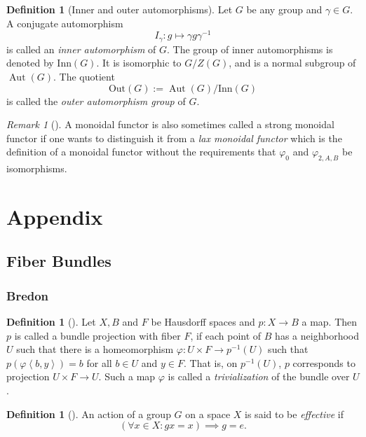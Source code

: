 \documentclass[reqno]{amsart}
\theoremstyle{definition}
\newtheorem{definition}[theorem]{Definition}
\theoremstyle{remark}
\newtheorem*{remark}{Remark}
\DeclareMathOperator{\Aut}{Aut}
\begin{document}
\begin{definition}[Inner and outer automorphisms]
    Let $G$ be any group and $\gamma \in G$. A conjugate
    automorphism 
    \[
    I_{\gamma} \colon g \mapsto \gamma g \gamma^{-1}
    \] 
    is called an \textit{inner automorphism} of $G$.
    The group of inner automorphisms is denoted
    by $\text{Inn}(G)$. It is isomorphic to
    $G / Z(G)$, and is a normal subgroup of
    $\Aut(G)$. The quotient
    \[
    \text{Out}(G) := \Aut(G) / \text{Inn}(G)
    \] 
    is called the \textit{outer automorphism group} of
    $G$.
\end{definition}



\begin{remark}[]
    A monoidal functor is also sometimes called a strong
    monoidal functor if one wants to distinguish it
    from a \textit{lax monoidal functor} which is
    the definition of a monoidal functor
    without the requirements that 
    $\varphi_0$ and $\varphi_{2,A,B}$ be isomorphisms.
\end{remark}

\section{Appendix}

\subsection{Fiber Bundles}

\subsubsection{Bredon}

\begin{definition}[]
    Let $X, B$ and $F$ be Hausdorff spaces and
    $p \colon X \to B$ a map.
    Then $p$ is called a bundle projection with
    fiber $F$, if each point of
    $B$ has a neighborhood $U$ such that there
    is a homeomorphism $\varphi \colon U \times F \to 
    p^{-1}(U) $ such that $p \left( \varphi
    \left<b,y  \right>\right) = b$ for all $b \in U$ and
    $y \in F$. That is, on  $p^{-1}(U)$, $p$ corresponds
    to projection $U \times F \to U$. Such a map
    $\varphi $ is called a \textit{trivialization} of the
    bundle over $U$.
\end{definition}

\begin{definition}[]
    An action of a group $G$ on a space $X$ is
    said to be \textit{effective} if
    \[
        \left( \forall x \in X \colon
        gx = x \right) \implies g = e.
    \] 
\end{definition}
\end{document}
